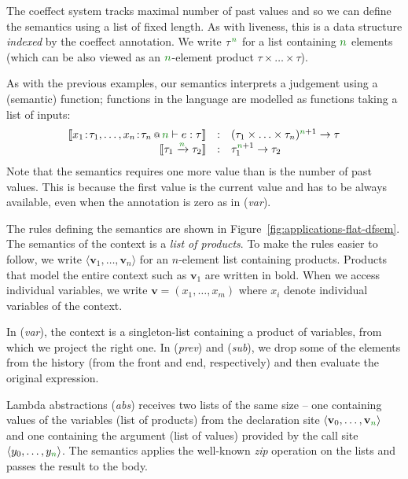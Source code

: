 The coeffect system tracks maximal number of past values and so we can define the semantics using
a list of fixed length. As with liveness, this is a data structure \emph{indexed} by the coeffect
annotation. We write $\tau^{\cclrd{n}}$ for a list containing $\cclrd{n}$ elements (which can be 
also viewed as an $\cclrd{n}$-element product $\tau \times \ldots \times \tau$). 

As with the previous examples, our semantics interprets a judgement using a (semantic) function;
functions in the language are modelled as functions taking a list of inputs:
%
\begin{equation*}
\begin{array}{rcl}
\sem{\coctx{x_1\!:\!\tau_1, \ldots, x_n\!:\!\tau_n}{ \cclrd{n} } \vdash e : \tau} 
  &:& (\tau_1 \times \ldots \times \tau_n)^{\cclrd{n}+1} \rightarrow \tau\\
\sem{\tau_1 \xrightarrow{\cclrd{n}} \tau_2} &:& \tau_1^{\cclrd{n}+1} \rightarrow \tau_2
\end{array}
\end{equation*}
%
Note that the semantics requires one more value than is the number of past values. This is because 
the first value is the current value and has to be always available, even when the annotation is
zero as in (\emph{var}).

The rules defining the semantics are shown in Figure~\ref{fig:applications-flat-dfsem}. The
semantics of the context is a \emph{list of products}. To make the rules easier to follow, we write
$\langle \mathbf{v}_1, \ldots, \mathbf{v}_n \rangle$ for an $n$-element list containing products.
Products that model the entire context such as $\mathbf{v}_1$ are written in bold. When we access
individual variables, we write $\mathbf{v} = (x_1, \ldots, x_m)$ where $x_i$ denote individual
variables of the context.

In (\emph{var}), the context is a singleton-list containing a product of variables, from which
we project the right one. In (\emph{prev}) and (\emph{sub}), we drop some of the elements from 
the history (from the front and end, respectively) and then evaluate the original expression.

Lambda abstractions (\emph{abs}) receives two lists of the same size -- one containing values of
the variables (list of products) from the declaration site $\langle \mathbf{v}_0, \ldots, \mathbf{v}_{\cclrd{n}} \rangle$ 
and one containing the argument (list of values) provided by the call site $\langle y_0, \ldots, y_{\cclrd{n}} \rangle$.
The semantics applies the well-known \emph{zip} operation on the lists and passes the result to the
body.

